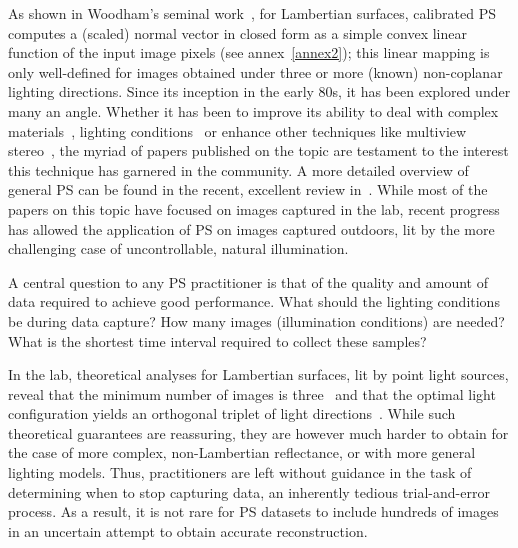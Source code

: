 As shown in Woodham's seminal work~\cite{woodham-opteng-80}, for Lambertian surfaces, calibrated PS computes a (scaled) normal vector in closed form as a simple convex linear function of the input image pixels (see annex~\ref{annex2}); this linear mapping is only well-defined for images obtained under three or more (known) non-coplanar lighting directions. 
Since its inception in the early 80s, it has been explored under many an angle. Whether it has been to improve its ability to deal with complex materials~\cite{alldrin-cvpr-08}, lighting conditions~\cite{alldrin-cvpr-08,basri-ijcv-07,johnson-cvpr-11,oxholm-eccv-12} or enhance other techniques like multiview stereo~\cite{snavely-ijcv-08}, the myriad of papers published on the topic are testament to the interest this technique has garnered in the community. A more detailed overview of general PS can be found in the recent, excellent review in~\cite{shi-tpami-18}. While most of the papers on this topic have focused on images captured in the lab, recent progress has allowed the application of PS on images captured outdoors, lit by the more challenging case of uncontrollable, natural illumination. 

A central question to any PS practitioner is that of the quality and amount of data required to achieve good performance. What should the lighting conditions be during data capture? How many images (illumination conditions) are needed? What is the shortest time interval required to collect these samples? 

In the lab, theoretical analyses for Lambertian surfaces, lit by point light sources, reveal that the minimum number of images is three~\cite{woodham-opteng-80} and that the optimal light configuration yields an orthogonal triplet of light directions~\cite{drbohlav-iccv-05}. While such theoretical guarantees are reassuring, they are however much harder to obtain for the case of more complex, non-Lambertian reflectance, or with more general lighting models. Thus, practitioners are left without guidance in the task of determining when to stop capturing data, an inherently tedious trial-and-error process. As a result, it is not rare for PS datasets to include hundreds of images~\cite{alldrin-cvpr-08} in an uncertain attempt to obtain accurate reconstruction. 

